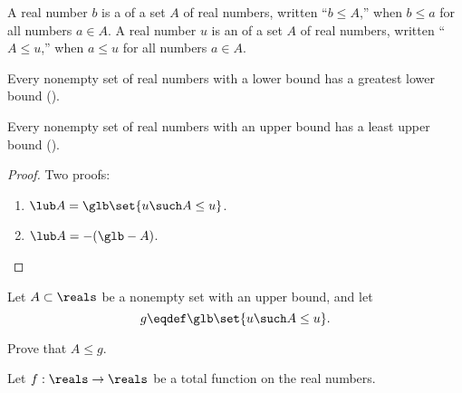 A real number $b$ is a  of a set $A$ of real
numbers, written ``$b \leq A$,'' when $b \leq a$ for all numbers $a
\in A$.  A real number $u$ is an  of a set $A$ of
real numbers, written ``$A \leq u$,'' when $a \leq u$ for all numbers
$a \in A$.

\begin{axiom}
Every nonempty set of real numbers with a lower bound has a greatest lower bound (\glb).
\end{axiom}

\begin{corollary}
Every nonempty set of real numbers with an upper bound has a least
upper bound (\lub).
\end{corollary}

\begin{proof}
Two proofs:

\begin{enumerate}(i)
\item $\lub A =  \glb\set{u \such A \leq u}$.
\item $\lub A = - (\glb -A)$.
\end{enumerate}
\end{proof}

\begin{problem}
Let $A \subset \reals$ be a nonempty set with an upper bound, and let
\[
g \eqdef \glb\set{u \such A \leq u}.
\]

Prove that $A \leq g$.

\begin{solution}
\end{solution}
\end{problem}

Let $f:\reals \to \reals$ be a total function on the real numbers.
